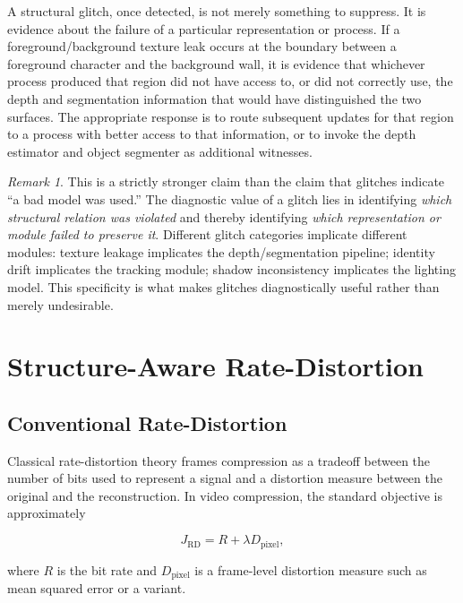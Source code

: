 \documentclass[12pt,a4paper]{article}
\theoremstyle{plain}
\theoremstyle{definition}
\theoremstyle{remark}
\newtheorem{remark}[theorem]{Remark}
\begin{document}
A structural glitch, once detected, is not merely something to suppress. It is evidence about the failure of a particular representation or process. If a foreground/background texture leak occurs at the boundary between a foreground character and the background wall, it is evidence that whichever process produced that region did not have access to, or did not correctly use, the depth and segmentation information that would have distinguished the two surfaces. The appropriate response is to route subsequent updates for that region to a process with better access to that information, or to invoke the depth estimator and object segmenter as additional witnesses.

\begin{remark}
This is a strictly stronger claim than the claim that glitches indicate ``a bad model was used.'' The diagnostic value of a glitch lies in identifying \textit{which structural relation was violated} and thereby identifying \textit{which representation or module failed to preserve it}. Different glitch categories implicate different modules: texture leakage implicates the depth/segmentation pipeline; identity drift implicates the tracking module; shadow inconsistency implicates the lighting model. This specificity is what makes glitches diagnostically useful rather than merely undesirable.
\end{remark}

\section{Structure-Aware Rate-Distortion}
\label{sec:ratedistortion}

\subsection{Conventional Rate-Distortion}

Classical rate-distortion theory \cite{berger1971,coverandthomas2006} frames compression as a tradeoff between the number of bits used to represent a signal and a distortion measure between the original and the reconstruction. In video compression, the standard objective is approximately

\[
J_{\mathrm{RD}} = R + \lambda D_{\mathrm{pixel}},
\]

where $R$ is the bit rate and $D_{\mathrm{pixel}}$ is a frame-level distortion measure such as mean squared error or a variant.
\end{document}
